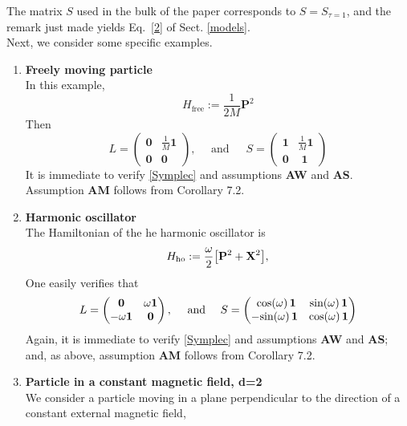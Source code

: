 \documentclass[11pt]{article}
\begin{document}
The matrix $S$ used in the bulk of the paper corresponds to $S=S_{\tau=1}$, and the remark just made yields Eq.~\eqref{2} of Sect. \ref{models}.\\

Next, we consider some specific examples.

\begin{enumerate}
	\item{{\bf{Freely moving particle}} \\
		In this example,
		\begin{equation}\label{freeham}
		H_{\text{free}}:= \frac{1}{2M} \mathbf{P}^{2}
		\end{equation}
		Then 
		$$L=\begin{pmatrix} \mathbf{0}& \frac{1}{M}\mathbf{1}\\ \mathbf{0} & \mathbf{0}\end{pmatrix}, \quad \text{ and  }\,\quad 
		S=\begin{pmatrix} \mathbf{1} & \frac{1}{M} \mathbf{1}\\ \mathbf{0} & \,\,\mathbf{1} \end{pmatrix} $$
		It is immediate to verify \eqref{Symplec} and assumptions {\bf{AW}} and {\bf{AS}}. Assumption {\bf{AM}} follows from Corollary 7.2.
	}
	\item{ {\bf{Harmonic oscillator}} \\
		The Hamiltonian of the he harmonic oscillator is 
		\begin{align}\label{osci}
		H_{{\rm ho}} :=  \frac{\omega}{2}\big[\mathbf P^2 +  \mathbf X^2\big],
		\end{align}
		One easily verifies that 
		$$L=\begin{pmatrix} {\bf{0}} & \omega \mathbf{1}\\ -\omega \mathbf{1} & \mathbf{0}\end{pmatrix}, \quad \text{  and }\quad 
		S=\begin{pmatrix} \,\, \text{cos}(\omega)\, \mathbf{1} &\text{sin}(\omega)\, \mathbf{1}\\- \text{sin}(\omega)\, \mathbf{1} & 
		\text{cos}(\omega)\, \mathbf{1} \end{pmatrix} $$
		Again, it is immediate to verify \eqref{Symplec} and assumptions {\bf{AW}} and {\bf{AS}}; and, as above, assumption {\bf{AM}} follows from Corollary 7.2.
	}
	\item{\bf{ Particle in a constant magnetic field, d=2}}\\
		We consider a particle moving in a plane perpendicular to the direction of a constant external magnetic field, 

\end{enumerate}
\end{document}
